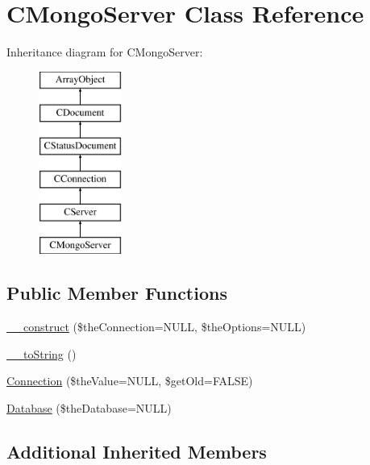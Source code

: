 \hypertarget{class_c_mongo_server}{\section{C\-Mongo\-Server Class Reference}
\label{class_c_mongo_server}
}
Inheritance diagram for C\-Mongo\-Server\-:\begin{figure}[H]
\begin{center}
\leavevmode
\includegraphics[height=6.000000cm]{class_c_mongo_server}
\end{center}
\end{figure}
\subsection*{Public Member Functions}
\begin{DoxyCompactItemize}
\item 
\hyperlink{class_c_mongo_server_ad70864e526dd380cc2440da5ff45ed50}{\-\_\-\-\_\-construct} (\$the\-Connection=N\-U\-L\-L, \$the\-Options=N\-U\-L\-L)
\item 
\hyperlink{class_c_mongo_server_a1842325257ca02c96123a1b49de976d0}{\-\_\-\-\_\-to\-String} ()
\item 
\hyperlink{class_c_mongo_server_a7bb403977a7f1a4d9a1391285f3ddd7e}{Connection} (\$the\-Value=N\-U\-L\-L, \$get\-Old=F\-A\-L\-S\-E)
\item 
\hyperlink{class_c_mongo_server_a68dce7b5cf2f8834d54495e290f64338}{Database} (\$the\-Database=N\-U\-L\-L)
\end{DoxyCompactItemize}
\subsection*{Additional Inherited Members}


